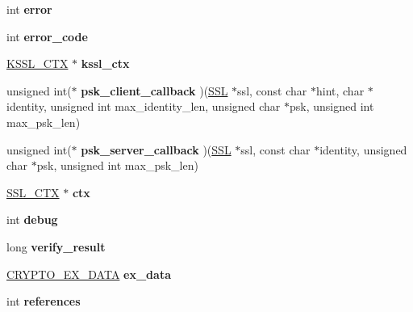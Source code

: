 \begin{DoxyCompactItemize}
\item 
\mbox{\label{structssl__st_aca7ac14e5548bdd96990fa1d12aaef02}} 
int {\bfseries error}
\item 
\mbox{\label{structssl__st_a6a6c337340e6b5986ca6a1381838c9ae}} 
int {\bfseries error\+\_\+code}
\item 
\mbox{\label{structssl__st_a1b2e26d71535a556a65c577216336e31}} 
\hyperlink{structkssl__ctx__st}{K\+S\+S\+L\+\_\+\+C\+TX} $\ast$ {\bfseries kssl\+\_\+ctx}
\item 
\mbox{\label{structssl__st_ade63f7a47c12d1957f6ccff7b374c69c}} 
unsigned int($\ast$ {\bfseries psk\+\_\+client\+\_\+callback} )(\hyperlink{structssl__st}{S\+SL} $\ast$ssl, const char $\ast$hint, char $\ast$identity, unsigned int max\+\_\+identity\+\_\+len, unsigned char $\ast$psk, unsigned int max\+\_\+psk\+\_\+len)
\item 
\mbox{\label{structssl__st_a2e36d9d815a0c1acd8d4cae04ad88aa1}} 
unsigned int($\ast$ {\bfseries psk\+\_\+server\+\_\+callback} )(\hyperlink{structssl__st}{S\+SL} $\ast$ssl, const char $\ast$identity, unsigned char $\ast$psk, unsigned int max\+\_\+psk\+\_\+len)
\item 
\mbox{\label{structssl__st_a5a3ac76eff749d5d3c9ecf6b1a230497}} 
\hyperlink{structssl__ctx__st}{S\+S\+L\+\_\+\+C\+TX} $\ast$ {\bfseries ctx}
\item 
\mbox{\label{structssl__st_a44db2b5a38c43821c3a852669e48d67f}} 
int {\bfseries debug}
\item 
\mbox{\label{structssl__st_a3092706c43455cf6a410853d90aadb1f}} 
long {\bfseries verify\+\_\+result}
\item 
\mbox{\label{structssl__st_ab71808924564517a2cfa30d1d5da910e}} 
\hyperlink{structcrypto__ex__data__st}{C\+R\+Y\+P\+T\+O\+\_\+\+E\+X\+\_\+\+D\+A\+TA} {\bfseries ex\+\_\+data}
\item 
\mbox{\label{structssl__st_ac62377797495ce179f0110cb70867ccc}} 
int {\bfseries references}
\item 

\end{DoxyCompactItemize}
